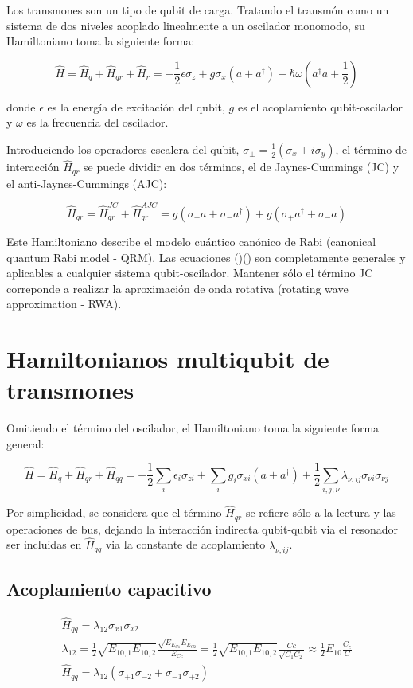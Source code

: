 Los transmones son un tipo de qubit de carga. Tratando el transmón como un sistema de dos niveles acoplado linealmente a un oscilador monomodo, su Hamiltoniano toma la siguiente forma:

\[
\hat{H} = \hat{H}_q + \hat{H}_{qr} + \hat{H}_r = -\frac{1}{2} \epsilon \sigma_z + g \sigma_x (a+a^\dag) + \hbar \omega (a^\dag a + \frac{1}{2})
\]

donde $\epsilon$ es la energía de excitación del qubit, $g$ es el acoplamiento qubit-oscilador y $\omega$ es la frecuencia del oscilador.
\vspace{0.5cm}

Introduciendo los operadores escalera del qubit, $\sigma_\pm = \frac{1}{2}(\sigma_x \pm i \sigma_y)$, el término de interacción $\hat{H}_{qr}$ se puede dividir en dos términos, el de Jaynes-Cummings (JC) y el anti-Jaynes-Cummings (AJC):

\[
\hat{H}_{qr} = \hat{H}_{qr}^{JC} + \hat{H}_{qr}^{AJC} = g(\sigma_+ a + \sigma_- a^\dag) + g(\sigma_+ a^\dag + \sigma_- a)
\]

Este Hamiltoniano describe el modelo cuántico canónico de Rabi (canonical quantum Rabi model - QRM). Las ecuaciones ()() son completamente generales y aplicables a cualquier sistema qubit-oscilador. Mantener sólo el término JC correponde a realizar la aproximación de onda rotativa (rotating wave approximation - RWA).

\section{Hamiltonianos multiqubit de transmones}
Omitiendo el término del oscilador, el Hamiltoniano toma la siguiente forma general:

\[
\hat{H} = \hat{H}_q + \hat{H}_{qr} + \hat{H}_{qq} = -\frac{1}{2} \sum\limits_i \epsilon_i \sigma_{zi} + \sum\limits_i g_i \sigma_{xi} (a+a^\dag) + \frac{1}{2} \sum\limits_{i,j;\nu} \lambda_{\nu,ij} \sigma_{\nu i} \sigma_{\nu j}
\]

Por simplicidad, se considera que el término $\hat{H}_{qr}$ se refiere sólo a la lectura y las operaciones de bus, dejando la interacción indirecta qubit-qubit via el resonador ser incluidas en $\hat{H}_{qq}$ via la constante de acoplamiento $\lambda_{\nu,ij}$.

\subsection{Acoplamiento capacitivo}
\begin{align*}
\hat{H}_{qq} = \lambda_{1 2} \sigma_{x1} \sigma_{x2} \\
\lambda_{1 2} = \frac{1}{2} \sqrt{E_{1 0, 1} E_{1 0, 2}} \frac{\sqrt{E_{E_{C1}} E_{E_{C2}}}}{E_{Cc}} = \frac{1}{2} \sqrt{E_{1 0, 1} E_{1 0, 2}} \frac{Cc}{\sqrt{C_1 C_2}} \approx \frac{1}{2} E_{1 0} \frac{C_c}{C} \\
\hat{H}_{qq} = \lambda_{1 2} (\sigma_{+1} \sigma_{-2}  + \sigma_{-1} \sigma_{+2})
\end{align*}

